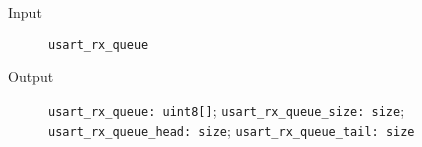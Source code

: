 \begin{flushleft}
  \begin{description}
    \item [Input]
      \verb#usart_rx_queue#
    \item [Output]
      \verb#usart_rx_queue: uint8[]#;
      \verb#usart_rx_queue_size: size#;
      \verb#usart_rx_queue_head: size#;
      \verb#usart_rx_queue_tail: size#
  \end{description}
\end{flushleft}
